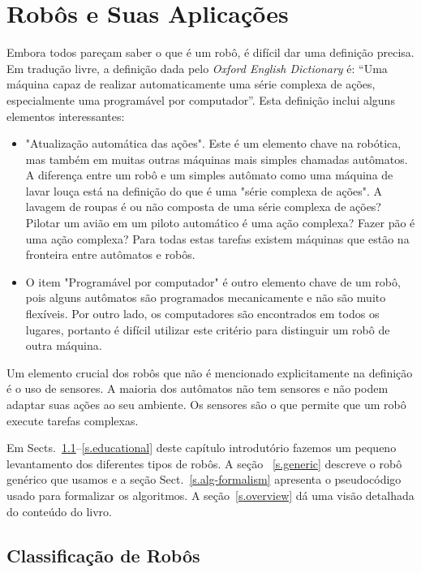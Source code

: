 
\chapter{Robôs e Suas Aplicações}\label{ch.basic}

Embora todos pareçam saber o que é um robô, é difícil dar uma definição precisa. Em tradução livre, a definição dada pelo \emph{Oxford English Dictionary} é: ``Uma máquina capaz de realizar automaticamente uma série complexa de ações, especialmente uma programável por computador''. Esta definição inclui alguns elementos interessantes:
\begin{itemize}
\item "Atualização automática das ações". Este é um elemento chave na robótica, mas também em muitas outras máquinas mais simples chamadas autômatos. A diferença entre um robô e um simples autômato como uma máquina de lavar louça está na definição do que é uma "série complexa de ações". A lavagem de roupas é ou não composta de uma série complexa de ações? Pilotar um avião em um piloto automático é uma ação complexa? Fazer pão é uma ação complexa? Para todas estas tarefas existem máquinas que estão na fronteira entre autômatos e robôs.
\item O item "Programável por computador" é outro elemento chave de um robô, pois alguns autômatos são programados mecanicamente e não são muito flexíveis. Por outro lado, os computadores são encontrados em todos os lugares, portanto é difícil utilizar este critério para distinguir um robô de outra máquina.
\end{itemize}
Um elemento crucial dos robôs que não é mencionado explicitamente na definição é o uso de sensores. A maioria dos autômatos não tem sensores e não podem adaptar suas ações ao seu ambiente. Os sensores são o que permite que um robô execute tarefas complexas. 

Em Sects.~\ref{s.classification}--\ref{s.educational} deste capítulo introdutório fazemos um pequeno levantamento dos diferentes tipos de robôs. A seção ~\ref{s.generic} descreve o robô genérico que usamos e a seção Sect.~\ref{s.alg-formalism} apresenta o pseudocódigo usado para formalizar os algoritmos. A seção~\ref{s.overview} dá uma visão detalhada do conteúdo do livro.

\section{Classificação de Robôs}\label{s.classification}

